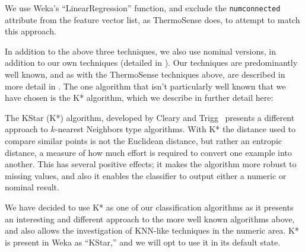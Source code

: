 \documentclass[../thesis/thesis.tex]{subfiles}
\begin{document}
We use Weka's ``LinearRegression'' function, and exclude the \texttt{numconnected} attribute from the feature vector list, as ThermoSense does, to attempt to match this approach.

In addition to the above three techniques, we also use nominal versions, in addition to our own techniques (detailed in \label{tab:methods:params}). Our techniques are predominantly well known, and as with the ThermoSense techniques above, are described in more detail in . The one algorithm that isn't particularly well known that we have chosen is the K* algorithm, which we describe in further detail here:

The KStar (K*) algorithm, developed by Cleary and Trigg~\cite{cleary1995k} presents a different approach to $k$-nearest Neighbors type algorithms. With K* the distance used to compare similar points is not the Euclidean distance, but rather an entropic distance, a measure of how much effort is required to convert one example into another. This has several positive effects; it makes the algorithm more robust to missing values, and also it enables the classifier to output either a numeric or nominal result.

We have decided to use K* as one of our classification algorithms as it presents an interesting and different approach to the more well known algorithms above, and also allows the investigation of KNN-like techniques in the numeric area. K* is present in Weka as ``KStar,'' and we will opt to use it in its default state.
\end{document}
